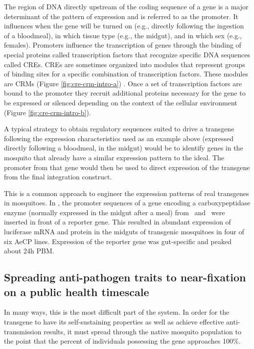 The region of DNA directly upstream of the coding sequence of a gene is a major determinant of the pattern of expression and is referred to as the promoter.
It influences when the gene will be turned on (e.g., directly following the ingestion of a bloodmeal), in which tissue type (e.g., the midgut), and in which sex (e.g., females).
Promoters influence the transcription of genes through the binding of special proteins called transcription factors that recognize specific DNA sequences called \glspl{CRE}.
\glspl{CRE} are sometimes organized into modules that represent groups of binding sites for a specific combination of transcription factors.
These modules are \glspl{CRM} (Figure \ref{fig:cre-crm-intro-a}) \cite{Davidson2010}.
Once a set of transcription factors are bound to the promoter they recruit additional proteins necessary for the gene to be expressed or silenced depending on the context of the cellular environment (Figure \ref{fig:cre-crm-intro-b}).



A typical strategy to obtain regulatory sequences suited to drive a transgene following the expression characteristics used as an example above (expressed directly following a bloodmeal, in the midgut) would be to identify genes in the mosquito that already have a similar expression pattern to the ideal.
The promoter from that gene would then be used to direct expression of the transgene from the final integration construct.

This is a common approach to engineer the expression patterns of real transgenes in mosquitoes.
In \citet{Moreira2000}, the promoter sequences of a gene encoding a carboxypeptidase enzyme (normally expressed in the midgut after a meal) from \Aa\ and \Ag\ were inserted in front of a reporter gene.
This resulted in abundant expression of \gls{luciferase} mRNA and protein in the midguts of transgenic mosquitoes in four of six AeCP lines.
Expression of the reporter gene was gut-specific and peaked about 24h \gls{PBM}.


\subsection{Spreading anti-pathogen traits to near-fixation on a public health timescale}

In many ways, this is the most difficult part of the system.
In order for the transgene to have its self-sustaining properties as well as achieve effective anti-transmission results, it must spread through the native mosquito population to the point that the percent of individuals possessing the gene approaches 100\%.

